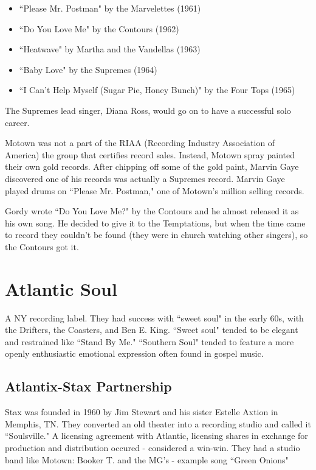 \documentclass[12pt, a4paper, twoside, openright, titlepage]{book}
\begin{document}
\begin{itemize}
    \item ``Please Mr. Postman" by the Marvelettes (1961)
    \item ``Do You Love Me" by the Contours (1962)
    \item ``Heatwave" by Martha and the Vandellas (1963)
    \item ``Baby Love" by the Supremes (1964)
    \item ``I Can't Help Myself (Sugar Pie, Honey Bunch)" by the Four Tops (1965)
\end{itemize}

\begin{rmk}{}{}
    The Supremes lead singer, Diana Ross, would go on to have a successful solo career.
\end{rmk}


Motown was not a part of the RIAA (Recording Industry Association of America) the group that certifies record sales. Instead, Motown spray painted their own gold records. After chipping off some of the gold paint, Marvin Gaye discovered one of his records was actually a Supremes record. Marvin Gaye played drums on ``Please Mr. Postman," one of Motown's million selling records.

Gordy wrote ``Do You Love Me?" by the Contours and he almost released it as his own song. He decided to give it to the Temptations, but when the time came to record they couldn't be found (they were in church watching other singers), so the Contours got it.


\section{Atlantic Soul}

A NY recording label. They had success with ``sweet soul" in the early 60s, with the Drifters, the Coasters, and Ben E. King. ``Sweet soul" tended to be elegant and restrained like ``Stand By Me." ``Southern Soul" tended to feature a more openly enthusiastic emotional expression often found in gospel music.

\subsection{Atlantix-Stax Partnership}

Stax was founded in 1960 by Jim Stewart and his sister Estelle Axtion in Memphis, TN. They converted an old theater into a recording studio and called it ``Soulsville." A licensing agreement with Atlantic, licensing shares in exchange for production and distribution occured - considered a win-win. They had a studio band like Motown: Booker T. and the MG's - example song ``Green Onions"
\end{document}
